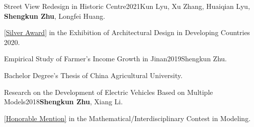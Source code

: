 \documentclass{joel_cv}
\begin{document}
\begin{enumerate}[label={[\arabic*]}]
	\item \begin{sectionContentNormal}{Street View Redesign in Historic Centre}{2021}{Kun Lyu, Xu Zhang, Huaiqian Lyu, \textbf{Shengkun Zhu}, Longfei Huang.} 
		
		\item \href{https://zhu-sk.github.io/SilverAward.pdf}{[Silver Award]} in the Exhibition of Architectural Design in Developing Countries 2020.
	\end{sectionContentNormal}
	
			\item \begin{sectionContentNormal}{Empirical Study of Farmer's Income Growth in Jinan}{2019}{Shengkun Zhu.}
		\item Bachelor Degree's Thesis of China Agricultural University.
	\end{sectionContentNormal}
	
		\item \begin{sectionContentNormal}{Research on the Development of Electric Vehicles Based on Multiple Models}{2018}{\textbf{Shengkun Zhu}, Xiang Li.}
		\item \href{https://zhu-sk.github.io/MCM_ICM.pdf}{[Honorable Mention]} in the Mathematical/Interdisciplinary Contest in Modeling.
	\end{sectionContentNormal}
	
	

\end{enumerate}
\end{document}
